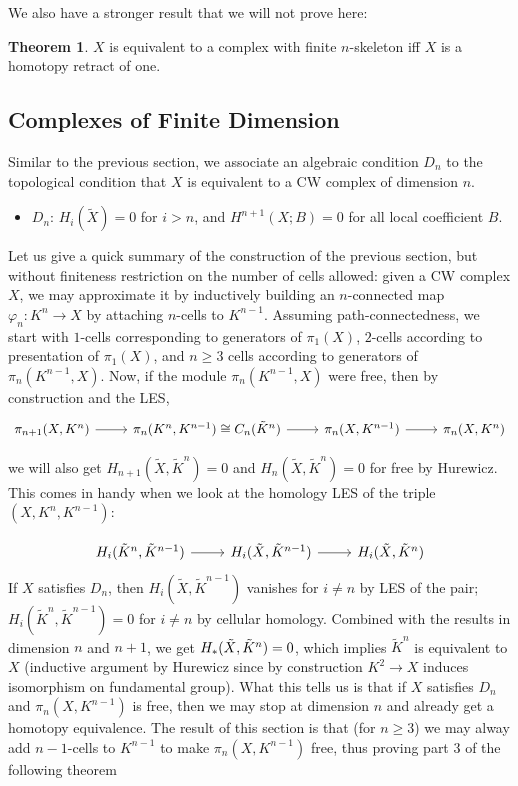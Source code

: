 \documentclass{article}
\theoremstyle{definition}
\newtheorem{theorem}{Theorem}[section]
\theoremstyle{definition}
\theoremstyle{definition}
\theoremstyle{definition}
\theoremstyle{definition}
\theoremstyle{definition}
\theoremstyle{definition}
\begin{document}
We also have a stronger result that we will not prove here:
\begin{tcolorbox}[colback=red!5!white,colframe=red!30!white]
\begin{theorem}
$X$ is equivalent to a complex with finite $n$-skeleton iff $X$ is a homotopy retract of one.
\end{theorem}
\end{tcolorbox}


\subsection{Complexes of Finite Dimension}



Similar to the previous section, we associate an algebraic condition $D_n$ to the topological condition that $X$ is equivalent to a CW complex of dimension $n$.

\begin{itemize}
  \item $D_n$: $H_i(\tilde{X})=0$ for $i>n$, and $H^{n+1}(X;B)=0$ for all local coefficient $B$. 
\end{itemize}

Let us give a quick summary of the construction of the previous section, but without finiteness restriction on the number of cells allowed: given a CW complex $X$, we may approximate it by inductively building an $n$-connected map $\varphi_n: K^n\to X$ by attaching $n$-cells to $K^{n-1}$. Assuming path-connectedness, we start with $1$-cells corresponding to generators of $\pi_1(X)$, $2$-cells according to presentation of $\pi_1(X)$, and $n\geq 3$ cells according to generators of $\pi_n(K^{n-1},X)$. Now, if the module $\pi_n(K^{n-1},X)$ were free, then by construction and the LES,
\[\begin{tikzcd}
  \pi_{n+1}(X,K^{n})\arrow[r]&\pi_n(K^n,K^{n-1})\cong C_n(\tilde{K}^n)\arrow[r]&\pi_n(X,K^{n-1})\arrow[r]&\pi_n(X,K^n)
  \end{tikzcd}\]

we will also get $H_{n+1}(\tilde{X},\tilde{K}^{n})=0$ and $H_{n}(\tilde{X},\tilde{K}^{n})=0$ for free by Hurewicz. This comes in handy when we look at the homology LES of the triple $(X,K^{n},K^{n-1})$:

\[
  \begin{tikzcd}
  H_i(\tilde{K}^n,\tilde{K}^{n-1})\arrow[r]&H_i(\tilde{X},\tilde{K}^{n-1})\arrow[r]&H_i(\tilde{X},\Tilde{K}^n)
\end{tikzcd}
\]
If $X$ satisfies $D_n$, then $H_i(\tilde{X},\tilde{K}^{n-1})$ vanishes for $i\neq n$ by LES of the pair; $H_i(\tilde{K}^n,\tilde{K}^{n-1})=0$ for $i\neq n$ by cellular homology. Combined with the results in dimension $n$ and $n+1$, we get $H_*(\tilde{X},\Tilde{K}^n)=0$, which implies $\tilde{K}^n$ is equivalent to $X$ (inductive argument by Hurewicz since by construction $K^2\to X$ induces isomorphism on fundamental group). What this tells us is that if $X$ satisfies $D_n$ and $\pi_n(X,K^{n-1})$ is free, then we may stop at dimension $n$ and already get a homotopy equivalence. The result of this section is that (for $n\geq 3$) we may alway add $n-1$-cells to $K^{n-1}$ to make $\pi_n(X,K^{n-1})$ free, thus proving part $3$ of the following theorem
\end{document}

